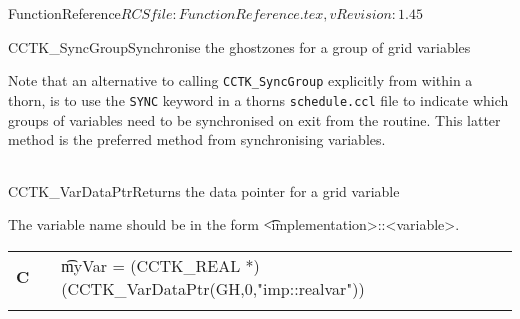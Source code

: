 \begin{cactuspart}{5}{FunctionReference}{$RCSfile: FunctionReference.tex,v $}{$Revision: 1.45 $}
\begin{CCTKFunc}{CCTK\_SyncGroup}{Synchronise the ghostzones for a group of grid variables}
\begin{discussion}
Note that an alternative to calling {\tt CCTK\_SyncGroup} explicitly
from within a thorn, is to use the {\tt SYNC} keyword in a thorns
{\tt schedule.ccl} file to indicate which groups of variables need
to be synchronised on exit from the routine. This latter method is
the preferred method from synchronising variables.
\end{discussion}
\begin{examples}
\begin{tabular}{@{}p{3cm}cp{11cm}}
\end{tabular}
\end{examples}
\begin{errorcodes}
\end{errorcodes}
\end{CCTKFunc}







\begin{CCTKFunc}{CCTK\_VarDataPtr}{Returns the data pointer for a grid variable}
\label{CCTK-VarDataPtr}
\showcargs
\begin{params}
\end{params}
\begin{discussion}
The variable name should be in the form {\t <implementation>::<variable>}.
\end{discussion}
\begin{examples}
\begin{tabular}{@{}p{3cm}cp{11cm}}
\hfill {\bf C} && {\t myVar = (CCTK\_REAL *)(CCTK\_VarDataPtr(GH,0,"imp::realvar"))}\\
\\
\end{tabular}
\end{examples}
\begin{errorcodes}
\end{errorcodes}
\end{CCTKFunc}


\end{cactuspart}
